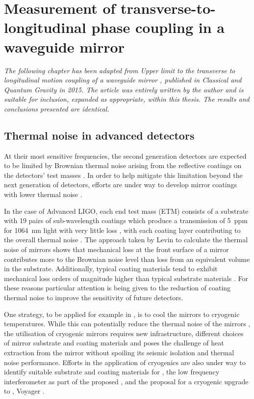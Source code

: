 \chapter{\label{c:waveguides}Measurement of transverse-to-longitudinal phase coupling in a waveguide mirror}

\emph{The following chapter has been adapted from \emph{Upper limit to the transverse to longitudinal motion coupling of a waveguide mirror \cite{Leavey2015}}, published in \emph{Classical and Quantum Gravity} in 2015. The article was entirely written by the author and is suitable for inclusion, expanded as appropriate, within this thesis. The results and conclusions presented are identical.}

\section{Thermal noise in advanced detectors}
At their most sensitive frequencies, the second generation detectors are expected to be limited by Brownian thermal noise arising from the reflective coatings on the detectors' test masses \cite{Levin1998, Nakagawa2002, Harry2002, Crooks2002}. In order to help mitigate this limitation beyond the next generation of detectors, efforts are under way to develop mirror coatings with lower thermal noise \cite{Flaminio2010, Bassiri2013}.

In the case of Advanced LIGO, each end test mass (\gls{ETM}) consists of a substrate with \num{19} pairs of sub-wavelength coatings which produce a transmission of \SI{5}{ppm} for \SI{1064}{\nano\meter} light with very little loss \cite{Dannenberg2009}, with each coating layer contributing to the overall thermal noise \cite{Harry2002, Crooks2002}. The approach taken by Levin to calculate the thermal noise of mirrors \cite{Levin1998} shows that mechanical loss at the front surface of a mirror contributes more to the Brownian noise level than loss from an equivalent volume in the substrate. Additionally, typical coating materials tend to exhibit mechanical loss orders of magnitude higher than typical substrate materials \cite{Harry2002, Crooks2002}. For these reasons particular attention is being given to the reduction of coating thermal noise to improve the sensitivity of future detectors.

One strategy, to be applied for example in \KAGRA{} \cite{Sakakibara2014}, is to cool the mirrors to cryogenic temperatures. While this can potentially reduce the thermal noise of the mirrors \cite{Uchiyama2012}, the utilisation of cryogenic mirrors requires new infrastructure, different choices of mirror substrate and coating materials and poses the challenge of heat extraction from the mirror without spoiling its seismic isolation and thermal noise performance. Efforts in the application of cryogenics are also under way to identify suitable substrate and coating materials for \ETLF{}, the low frequency interferometer as part of the proposed \ET{} \cite{Punturo2010, Martin2010, Hild2011, Abernathy2011}, and the proposal for a cryogenic upgrade to \LIGO{}, Voyager \cite{aligoinst2015}.

